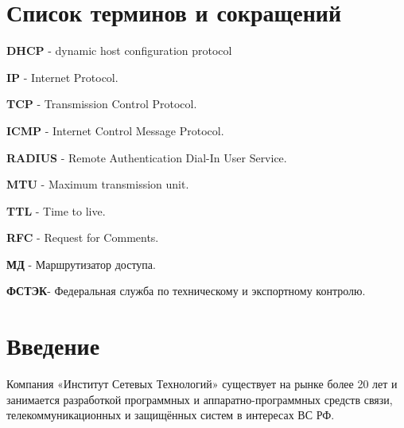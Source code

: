 \documentclass[14pt,a4paper]{extarticle}
\begin{document}
\renewcommand{\refname}{Список использованных источников} %

\setcounter{page}{7}

\pagebreak
\tableofcontents

\pagebreak
\section*{Список терминов и сокращений}

\textbf{DHCP} - dynamic host configuration protocol

\textbf{IP} - Internet Protocol.

\textbf{TCP} - Transmission Control Protocol.

\textbf{ICMP} - Internet Control Message Protocol.

\textbf{RADIUS} - Remote Authentication Dial-In User Service.

\textbf{MTU} - Maximum transmission unit.

\textbf{TTL} - Time to live.

\textbf{RFC} - Request for Comments.

\textbf{МД} - Маршрутизатор доступа.

\textbf{ФСТЭК}- Федеральная служба по техническому и экспортному контролю.


\pagebreak
\section*{Введение}


Компания «Институт Сетевых Технологий» существует на рынке более 20 лет и
занимается разработкой программных и аппаратно-программных средств связи,  телекоммуникационных и защищённых систем в интересах ВС РФ.
\end{document}
